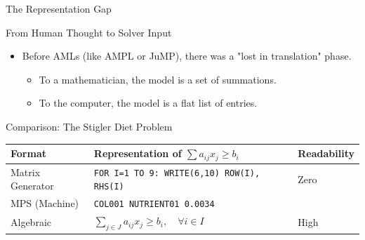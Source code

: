 \documentclass[presentation, aspectratio=169]{beamer}
\begin{document}
\begin{frame}[label={sec:orge2e128f},fragile]{The Representation Gap}
 \begin{block}{From Human Thought to Solver Input}
\begin{itemize}
\item Before AMLs (like AMPL or JuMP), there was a "lost in translation" phase.
\begin{itemize}
\item To a mathematician, the model is a set of summations.
\item To the computer, the model is a flat list of entries.
\end{itemize}
\end{itemize}
\end{block}

\begin{block}{Comparison: The Stigler Diet Problem}
\begin{center}
\begin{tabular}{|l|p{7cm}|l|}
\hline
Format & Representation of \(\sum a_{ij}x_j \ge b_i\) & Readability\\
\hline
\alert{\alert{Matrix Generator}} & \texttt{FOR I=1 TO 9: WRITE(6,10) ROW(I), RHS(I)} & Zero\\
\alert{\alert{MPS (Machine)}} & \texttt{COL001    NUTRIENT01  0.0034} & \\
\alert{\alert{Algebraic}} & \(\sum_{j \in J} a_{ij} x_j \ge b_i, \quad \forall i \in I\) & High\\
\hline
\end{tabular}
\end{center}
\end{block}
\end{frame}
\end{document}
